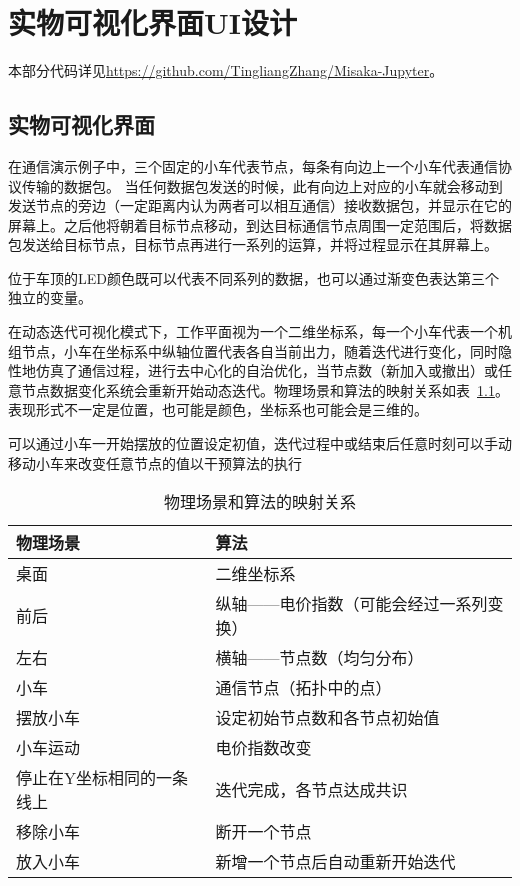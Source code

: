 \chapter{实物可视化界面UI设计}
\label{cha:UI}

本部分代码详见\url{https://github.com/TingliangZhang/Misaka-Jupyter}。

\section{实物可视化界面}

在通信演示例子中，三个固定的小车代表节点，每条有向边上一个小车代表通信协议传输的数据包。
当任何数据包发送的时候，此有向边上对应的小车就会移动到发送节点的旁边（一定距离内认为两者可以相互通信）接收数据包，并显示在它的屏幕上。之后他将朝着目标节点移动，到达目标通信节点周围一定范围后，将数据包发送给目标节点，目标节点再进行一系列的运算，并将过程显示在其屏幕上。

位于车顶的LED颜色既可以代表不同系列的数据，也可以通过渐变色表达第三个独立的变量。


在动态迭代可视化模式下，工作平面视为一个二维坐标系，每一个小车代表一个机组节点，小车在坐标系中纵轴位置代表各自当前出力，随着迭代进行变化，同时隐性地仿真了通信过程，进行去中心化的自治优化，当节点数（新加入或撤出）或任意节点数据变化系统会重新开始动态迭代。物理场景和算法的映射关系如表~\ref{tab:Real-Unreal}。表现形式不一定是位置，也可能是颜色，坐标系也可能会是三维的。

可以通过小车一开始摆放的位置设定初值，迭代过程中或结束后任意时刻可以手动移动小车来改变任意节点的值以干预算法的执行

\begin{table}[htbp]
    \centering
    \begin{tabular}{@{}ll@{}}
    \toprule
    物理场景          & 算法                   \\ \midrule
    桌面            & 二维坐标系                \\
    前后            & 纵轴——电价指数（可能会经过一系列变换） \\
    左右            & 横轴——节点数（均匀分布）        \\
    小车            & 通信节点（拓扑中的点）          \\
    摆放小车          & 设定初始节点数和各节点初始值       \\
    小车运动          & 电价指数改变               \\
    停止在Y坐标相同的一条线上 & 迭代完成，各节点达成共识         \\
    移除小车          & 断开一个节点               \\
    放入小车          & 新增一个节点后自动重新开始迭代      \\ \bottomrule
    \end{tabular}
    \caption{物理场景和算法的映射关系}
    \label{tab:Real-Unreal}
\end{table}

